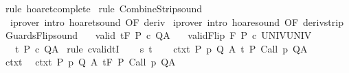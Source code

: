 \begin{isabellebody}
%
\isadelimproof
%
\endisadelimproof
%
\isatagproof
{}\isamarkupfalse%
\ {\isacharparenleft}rule\ hoaret{\isacharunderscore}complete{\isacharprime}{\isacharparenright}\isanewline
{}\isamarkupfalse%
\ {\isacharparenleft}rule\ CombineStrip{\isacharunderscore}sound{\isacharparenright}\isanewline
{}\isamarkupfalse%
\ \ {\isacharparenleft}iprover\ intro{\isacharcolon}\ hoaret{\isacharunderscore}sound\ {\isacharbrackleft}OF\ deriv{\isacharbrackright}{\isacharparenright}\isanewline
{}\isamarkupfalse%
\ {\isacharparenleft}iprover\ intro{\isacharcolon}\ hoare{\isacharunderscore}sound\ {\isacharbrackleft}OF\ deriv{\isacharunderscore}strip{\isacharbrackright}{\isacharparenright}\isanewline
{}\isamarkupfalse%
%
\endisatagproof
{\isafoldproof}%
%
\isadelimproof
\isanewline
%
\endisadelimproof
\isanewline
{}\isamarkupfalse%
\ GuardsFlip{\isacharunderscore}sound{\isacharcolon}\isanewline
\ \ \ valid{\isacharcolon}\ {\isachardoublequoteopen}{\isasymGamma}{\isacharcomma}{\isasymTheta}{\isasymTurnstile}\isactrlsub t\isactrlbsub {\isacharslash}F\isactrlesub \ P\ c\ Q{\isacharcomma}A{\isachardoublequoteclose}\isanewline
\ \ \ validFlip{\isacharcolon}\ {\isachardoublequoteopen}{\isasymGamma}{\isacharcomma}{\isasymTheta}{\isasymTurnstile}\isactrlbsub {\isacharslash}{\isacharminus}F\isactrlesub \ P\ c\ UNIV{\isacharcomma}UNIV{\isachardoublequoteclose}\isanewline
\ \ \ {\isachardoublequoteopen}{\isasymGamma}{\isacharcomma}{\isasymTheta}{\isasymTurnstile}\isactrlsub t\isactrlbsub {\isacharslash}{\isacharbraceleft}{\isacharbraceright}\isactrlesub \ P\ c\ Q{\isacharcomma}A{\isachardoublequoteclose}\isanewline
%
\isadelimproof
%
\endisadelimproof
%
\isatagproof
{}\isamarkupfalse%
\ {\isacharparenleft}rule\ cvalidtI{\isacharparenright}\isanewline
\ \ \isamarkupfalse%
\ s\ t\isanewline
\ \ \isamarkupfalse%
\ ctxt{\isacharcolon}\ {\isachardoublequoteopen}{\isasymforall}{\isacharparenleft}P{\isacharcomma}\ p{\isacharcomma}\ Q{\isacharcomma}\ A{\isacharparenright}{\isasymin}{\isasymTheta}{\isachardot}\ {\isasymGamma}{\isasymTurnstile}\isactrlsub t\isactrlbsub {\isacharslash}{\isacharbraceleft}{\isacharbraceright}\isactrlesub \ P\ {\isacharparenleft}Call\ p{\isacharparenright}\ Q{\isacharcomma}A{\isachardoublequoteclose}\ \isanewline
\ \ \isamarkupfalse%
\ ctxt\ \isamarkupfalse%
\ ctxt{\isacharprime}{\isacharcolon}\ {\isachardoublequoteopen}{\isasymforall}{\isacharparenleft}P{\isacharcomma}\ p{\isacharcomma}\ Q{\isacharcomma}\ A{\isacharparenright}{\isasymin}{\isasymTheta}{\isachardot}\ {\isasymGamma}{\isasymTurnstile}\isactrlsub t\isactrlbsub {\isacharslash}F\isactrlesub \ P\ {\isacharparenleft}Call\ p{\isacharparenright}\ Q{\isacharcomma}A{\isachardoublequoteclose}\ \isanewline

\end{isabellebody}
